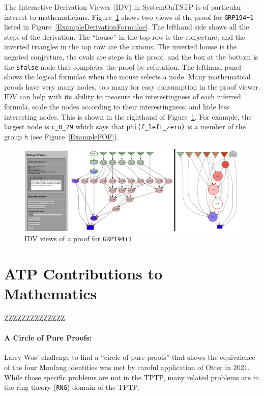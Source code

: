 \documentclass[runningheads]{llncs}
\begin{document}
The Interactive Derivation Viewer (IDV) in SystemOnTSTP is of particular interest to mathematicians.
Figure~\ref{IDV} shows two views of the proof for {\tt GRP194+1} listed in 
Figure~\ref{ExampleDerivationFormulae}.
The lefthand side shows all the steps of the derivation.
The ``house'' in the top row is the conjecture, and the inverted triangles in the top row are the
axioms.
The inverted house is the negated conjecture, the ovals are steps in the proof, and the box at the
bottom is the {\tt \$false} node that completes the proof by refutation.
The lefthand panel shows the logical formulae when the mouse selects a node.
Many mathematical proofs have very many nodes, too many for easy consumption in the proof viewer.
IDV can help with its ability to measure the interestingness of each inferred formula, scale the
nodes according to their interestingness, and hide less interesting nodes.
This is shown in the righthand of Figure~\ref{IDV}.
For example, the largest node is {\tt c\_0\_29} which says that {\tt phi(f\_left\_zero)} is a 
member of the group {\tt h} (see Figure~\ref{ExampleFOF}).

\begin{figure}[htb]
\centering
\includegraphics[width=1.0\textwidth]{IDV.pdf}
\vspace*{-1em}
\caption{IDV views of a proof for {\tt GRP194+1}}
\label{IDV}
\end{figure}

\section{ATP Contributions to Mathematics}
\label{Contributions}

ZZZZZZZZZZZZZZ

\paragraph{A Circle of Pure Proofs:}
Larry Wos' challenge to find a ``circle of pure proofs'' that shows the equivalence
of the four Moufang identities \cite{Wos19} was met by careful application \cite{Ver22} of
Otter \cite{McC03-Otter} in 2021.
While those specific problems are not in the TPTP, many related problems are in the
ring theory ({\tt RNG}) domain of the TPTP.
\end{document}
